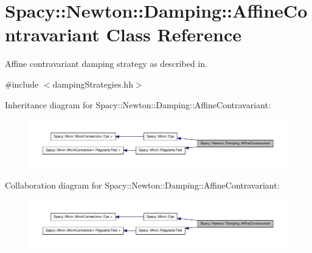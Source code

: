 \hypertarget{classSpacy_1_1Newton_1_1Damping_1_1AffineContravariant}{\section{\-Spacy\-:\-:\-Newton\-:\-:\-Damping\-:\-:\-Affine\-Contravariant \-Class \-Reference}
\label{classSpacy_1_1Newton_1_1Damping_1_1AffineContravariant}
}


\-Affine contravariant damping strategy as described in.  




{\ttfamily \#include $<$damping\-Strategies.\-hh$>$}



\-Inheritance diagram for \-Spacy\-:\-:\-Newton\-:\-:\-Damping\-:\-:\-Affine\-Contravariant\-:
\nopagebreak
\begin{figure}[H]
\begin{center}
\leavevmode
\includegraphics[width=350pt]{classSpacy_1_1Newton_1_1Damping_1_1AffineContravariant__inherit__graph}
\end{center}
\end{figure}


\-Collaboration diagram for \-Spacy\-:\-:\-Newton\-:\-:\-Damping\-:\-:\-Affine\-Contravariant\-:
\nopagebreak
\begin{figure}[H]
\begin{center}
\leavevmode
\includegraphics[width=350pt]{classSpacy_1_1Newton_1_1Damping_1_1AffineContravariant__coll__graph}
\end{center}
\end{figure}
